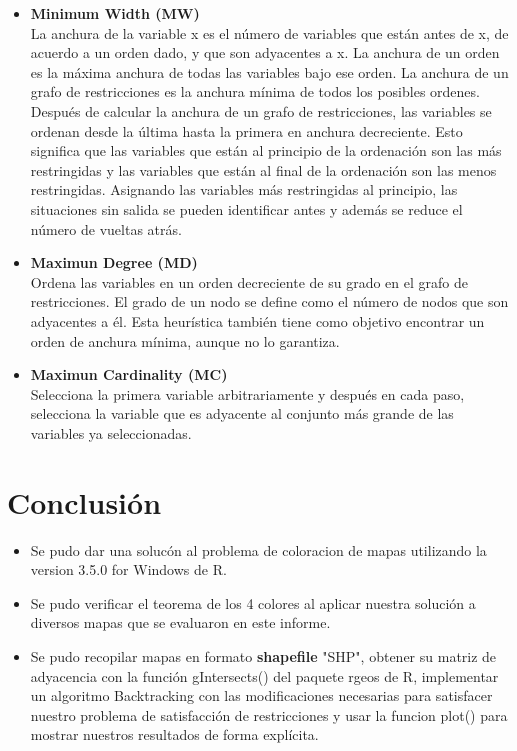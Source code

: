 \documentclass[a4paper]{article}
\begin{document}
\begin{itemize}	
	
\item \textbf{Minimum Width (MW)}\\
La anchura de la variable x es el número de variables que están antes de x, de acuerdo a un orden dado, y que son adyacentes a x. La anchura de un orden es la máxima anchura de todas las variables bajo ese orden. La anchura de un grafo de restricciones es la anchura mínima de todos los posibles ordenes. Después de calcular la anchura de un grafo de restricciones, las variables se ordenan desde la última hasta la primera en anchura decreciente. Esto significa que las variables que están al principio de la ordenación son las más restringidas y las variables que están al final de la ordenación son las menos restringidas. Asignando las variables más restringidas al principio, las situaciones sin salida se pueden identificar antes y además se reduce el número de vueltas atrás.

\item \textbf{Maximun Degree (MD)}\\
Ordena las variables en un orden decreciente de su grado en el grafo de restricciones. El grado de un nodo se define como el número de nodos que son adyacentes a él. Esta heurística también tiene como objetivo encontrar un orden de anchura mínima, aunque no lo garantiza.

\item \textbf{Maximun Cardinality (MC)}\\
Selecciona la primera variable arbitrariamente y después en cada paso, selecciona la variable que es adyacente al conjunto más grande de las variables ya seleccionadas.

\end{itemize}


\section{Conclusi\'on}
\begin{itemize}

\item Se pudo dar una soluc\'on al problema de coloracion de mapas utilizando la version 3.5.0 for Windows de R.
\item Se pudo verificar el teorema de los 4 colores al aplicar nuestra soluci\'on a diversos mapas que se evaluaron en este informe.
\item Se pudo recopilar mapas en formato \textbf{shapefile} "SHP", obtener su matriz de adyacencia con la funci\'on gIntersects() del paquete rgeos de R, implementar un algoritmo Backtracking con las modificaciones necesarias para satisfacer nuestro problema de satisfacci\'on de restricciones y usar la funcion plot() para mostrar nuestros resultados de forma expl\'icita.
\end{itemize}
\end{document}
